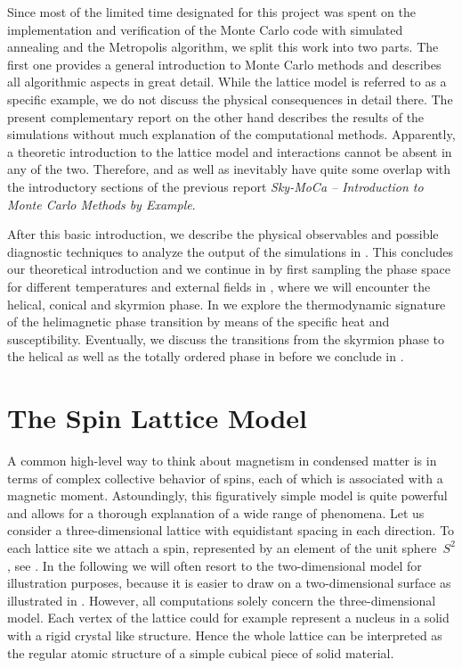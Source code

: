 Since most of the limited time designated for this project was spent on the
implementation and verification of the Monte Carlo code with simulated annealing
and the Metropolis algorithm, we split this work into two parts. The first one
provides a general introduction to Monte Carlo methods and describes all
algorithmic aspects in great detail. While the lattice model is referred to as
a specific example, we do not discuss the physical consequences in detail there.
The present complementary report on the other hand describes the results of the
simulations without much explanation of the computational methods. Apparently, a
theoretic introduction to the lattice model and interactions cannot be absent in
any of the two. Therefore,  and  as
well as  inevitably have quite some overlap with the
introductory sections of the previous report \emph{Sky-MoCa -- Introduction to
Monte Carlo Methods by Example}.

After this basic introduction, we describe the physical observables and possible
diagnostic techniques to analyze the output of the simulations in
. This concludes our theoretical introduction and we
continue in  by first sampling the phase space for different
temperatures and external fields in , where we will encounter
the helical, conical and skyrmion phase. In  we explore the
thermodynamic signature of the helimagnetic phase transition by means of the
specific heat and susceptibility. Eventually, we discuss the transitions from
the skyrmion phase to the helical as well as the totally ordered phase in
 before we conclude in .
%
\section{The Spin Lattice Model}\label{sec:lattice}
%
A common high-level way to think about magnetism in condensed matter is in terms
of complex collective behavior of spins, each of which is associated with a
magnetic moment. Astoundingly, this figuratively simple model is quite powerful
and allows for a thorough explanation of a wide range of phenomena. Let us
consider a three-dimensional lattice with equidistant spacing in each direction.
To each lattice site we attach a spin, represented by an element of the unit
sphere~$S^2$, see . In the following we will often resort to the
two-dimensional model for illustration purposes, because it is easier to draw on
a two-dimensional surface as illustrated in . However, all
computations solely concern the three-dimensional model. Each vertex of the
lattice could for example represent a nucleus in a solid with a rigid crystal
like structure. Hence the whole lattice can be interpreted as the regular atomic
structure of a simple cubical piece of solid material.


